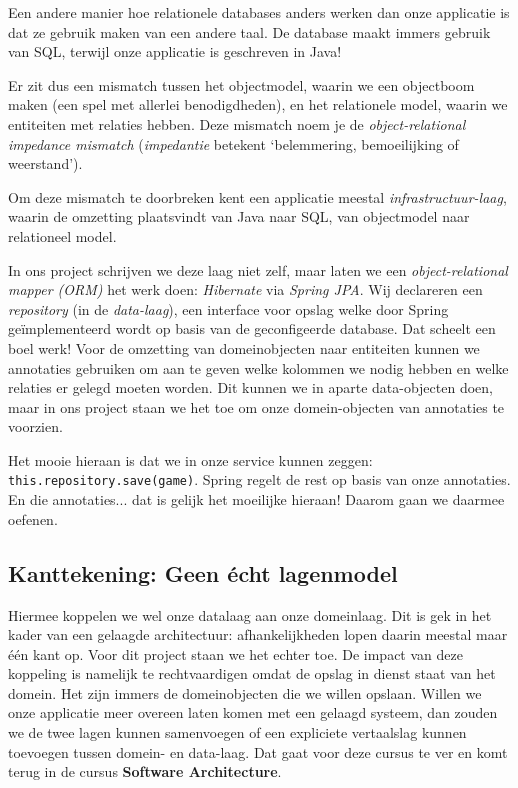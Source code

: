 Een andere manier hoe relationele databases anders werken dan onze applicatie is dat 
ze gebruik maken van een andere taal. De database maakt immers gebruik van SQL, terwijl 
onze applicatie is geschreven in Java!

Er zit dus een mismatch tussen het objectmodel, 
waarin we een objectboom maken (een spel met allerlei benodigdheden),
en het relationele model, waarin we entiteiten met relaties hebben.
Deze mismatch noem je de \textit{object-relational impedance mismatch}
(\textit{impedantie} betekent `belemmering, bemoeilijking of weerstand').

Om deze mismatch te doorbreken kent een applicatie meestal
\textit{infrastructuur-laag}, 
waarin de omzetting plaatsvindt van Java naar SQL, 
van objectmodel naar relationeel model.

In ons project schrijven we deze laag niet zelf, maar laten we 
een \textit{object-relational mapper (ORM)} het werk doen: 
\textit{Hibernate} via \textit{Spring JPA}.
Wij declareren een \textit{repository} 
(in de \textit{data-laag}), 
een interface voor opslag welke door Spring geïmplementeerd wordt
op basis van de geconfigeerde database. Dat scheelt een boel werk!
Voor de omzetting van domeinobjecten naar entiteiten kunnen 
we annotaties gebruiken om aan te geven welke kolommen we nodig hebben en welke relaties er 
gelegd moeten worden. Dit kunnen we in aparte data-objecten doen, maar
in ons project staan we het toe om onze domein-objecten van annotaties te voorzien.

Het mooie hieraan is dat we in onze service kunnen zeggen:
\texttt{this.repository.save(game)}. Spring regelt de rest op 
basis van onze annotaties. En die annotaties... dat is gelijk 
het moeilijke hieraan! Daarom gaan we daarmee oefenen.

\subsection{Kanttekening: Geen écht lagenmodel}
Hiermee koppelen we wel onze datalaag aan onze domeinlaag. Dit is 
gek in het kader van een gelaagde architectuur: afhankelijkheden lopen daarin 
meestal maar één kant op. Voor dit project staan we het echter toe.
De impact van deze koppeling is namelijk te rechtvaardigen omdat de opslag 
in dienst staat van het domein. Het zijn immers de domeinobjecten die we 
willen opslaan. Willen we onze applicatie meer overeen laten komen met een 
gelaagd systeem, dan zouden we de twee lagen kunnen samenvoegen of een expliciete 
vertaalslag kunnen toevoegen tussen domein- en data-laag. Dat gaat voor deze cursus te ver
en komt terug in de cursus \textbf{Software Architecture}.

